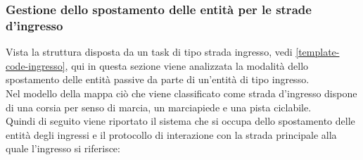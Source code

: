 \subsubsection{Gestione dello spostamento delle entità per le strade d'ingresso}
Vista la struttura disposta da un task di tipo strada ingresso, vedi \ref{template-code-ingresso}, qui in questa sezione viene analizzata la modalità dello spostamento delle entità passive da parte di un'entità di tipo ingresso.\\
Nel modello della mappa ciò che viene classificato come strada d'ingresso dispone di una corsia per senso di marcia, un marciapiede e una pista ciclabile.\\
Quindi di seguito viene riportato il sistema che si occupa dello spostamento delle entità degli ingressi e il protocollo di interazione con la strada principale alla quale l'ingresso si riferisce:
